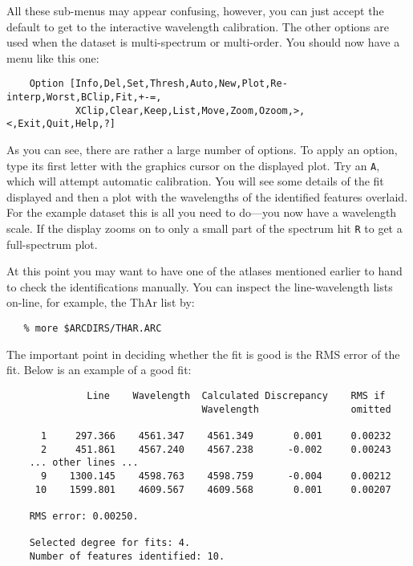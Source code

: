 \documentclass[twoside,11pt]{article}
\newcommand{\htmlref}[2]{#1}
\newcommand{\scspec}[2]{#1}
\newcommand{\scspec}[2]{#2}
\begin{document}
All these sub-menus may appear confusing, however, you can just accept
the default to get to the interactive wavelength calibration.
The other options are used when the dataset is multi-spectrum or
multi-order.
You should now have a menu like this one:

{
\scspec{\small}{ }
\begin{verbatim}
    Option [Info,Del,Set,Thresh,Auto,New,Plot,Re-interp,Worst,BClip,Fit,+-=,
            XClip,Clear,Keep,List,Move,Zoom,Ozoom,>,<,Exit,Quit,Help,?]
\end{verbatim}
}

As you can see, there are rather a large number of options.  To apply an
option, type its first letter with the graphics cursor on the displayed plot.
Try an \verb+A+, which will attempt automatic calibration.  You will see
some details of the fit displayed and then a plot with the wavelengths of the
identified features overlaid.  For the example dataset this is all you
need to do\scspec{---}{ - }you now have a wavelength scale.
If the display zooms on to only a small part of the spectrum hit
\verb+R+ to get a full-spectrum plot.

At this point you may want to have one of the \htmlref{atlases}{atlases}
mentioned earlier to hand to check the identifications manually.
You can inspect the line-wavelength lists on-line, for example, the
ThAr list by:

{
\scspec{\small}{ }
\begin{verbatim}
   % more $ARCDIRS/THAR.ARC
\end{verbatim}
}

The important point in deciding whether the fit is good is the RMS error
of the fit.  Below is an example of a good fit:

{
\scspec{\small}{ }
\begin{verbatim}
              Line    Wavelength  Calculated Discrepancy    RMS if
                                  Wavelength                omitted

      1     297.366    4561.347    4561.349       0.001     0.00232
      2     451.861    4567.240    4567.238      -0.002     0.00243
    ... other lines ...
      9    1300.145    4598.763    4598.759      -0.004     0.00212
     10    1599.801    4609.567    4609.568       0.001     0.00207

    RMS error: 0.00250.

    Selected degree for fits: 4.
    Number of features identified: 10.
\end{verbatim}
}
\end{document}
